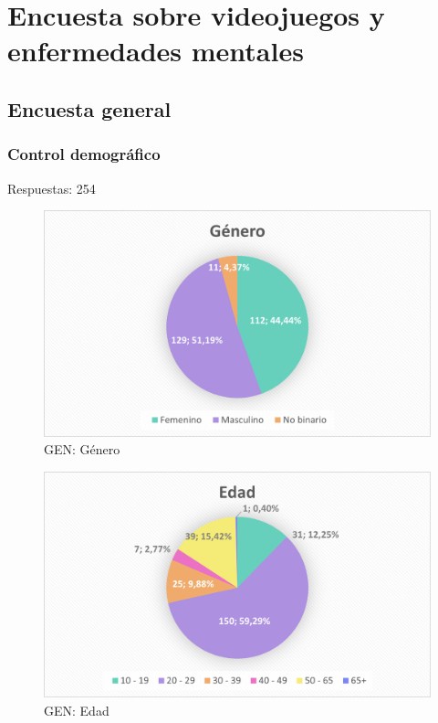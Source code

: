 \documentclass[12pt, a4paper,twoside,titlepage]{book}
\let\origdoublepage\cleardoublepage
\renewcommand{\cleardoublepage}{\clearpage{\pagestyle{empty}\origdoublepage}}
\begin{document}
\cleardoublepage
\appendix


\chapter{Encuesta sobre videojuegos y enfermedades mentales}
\label{sec:anexo}
\section{Encuesta general}

\subsection{Control demográfico}
Respuestas: 254



\begin{figure}
	\centering
	\includegraphics[width=.8\linewidth]{ANEXO Gen/1AnexGENGen}
	\caption{GEN: Género}
	\label{fig:GENGenero}
\end{figure}


\begin{figure}
	\centering
	\includegraphics[width=.8\linewidth]{ANEXO Gen/2AnexGENEdad}
	\caption{GEN: Edad}
	\label{fig:GENEdad}
\end{figure}
\end{document}
